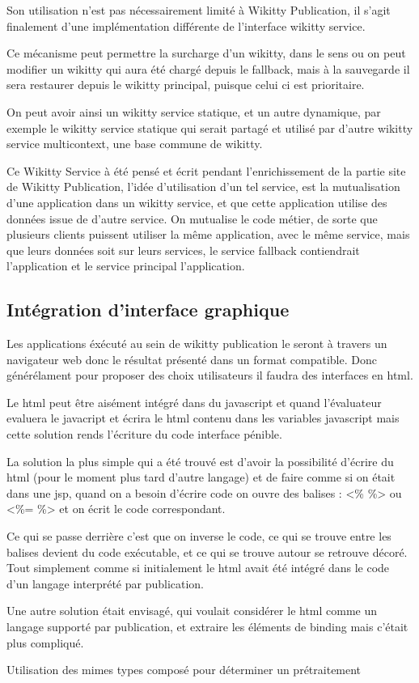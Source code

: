 Son utilisation n'est pas nécessairement limité à Wikitty Publication, il s'agit
finalement d'une implémentation différente de l'interface wikitty service. 

Ce mécanisme peut permettre la surcharge d'un wikitty, dans le sens ou on peut
modifier un wikitty qui aura été chargé depuis le fallback, mais à la sauvegarde
il sera restaurer depuis le wikitty principal, puisque celui ci est prioritaire.

On peut avoir ainsi un wikitty service statique, et un autre dynamique, par
exemple le wikitty service statique qui serait partagé et utilisé par d'autre
wikitty service multicontext, une base commune de wikitty. 

Ce Wikitty Service à été pensé et écrit pendant l'enrichissement de la partie 
site de Wikitty Publication, l'idée d'utilisation d'un tel service, est la 
mutualisation d'une application dans un wikitty service, et que cette 
application utilise des données issue de d'autre service. On mutualise le code 
métier, de sorte que plusieurs clients puissent utiliser la même application, 
avec le même service, mais que leurs données soit sur leurs services, 
le service fallback contiendrait l'application et le service principal 
l'application.

\subsection{Intégration d'interface graphique}

Les applications éxécuté au sein de wikitty publication le seront à travers 
un navigateur web donc le résultat présenté dans un format compatible.
Donc générélament pour proposer des choix utilisateurs il faudra des interfaces
en html.

Le html peut être aisément intégré dans du javascript et quand l'évaluateur
evaluera le javacript et écrira le html contenu dans les variables javascript
mais cette solution rends l'écriture du code interface pénible.





La solution la plus simple qui a été trouvé est d'avoir la possibilité d'écrire 
du html (pour le moment plus tard d'autre langage) et de faire comme si on était
dans une jsp, quand on a besoin d'écrire code on ouvre des balises : <\% \%>
ou <\%= \%> et on écrit le code correspondant.

Ce qui se passe derrière c'est que on inverse le code, ce qui se trouve entre
les balises devient du code exécutable, et ce qui se trouve autour se retrouve
décoré. Tout simplement comme si initialement le html avait été intégré dans
le code d'un langage interprété par publication.

Une autre solution était envisagé, qui voulait considérer le html comme un langage
supporté par publication, et extraire les éléments de binding mais c'était plus 
compliqué.

Utilisation des mimes types composé pour déterminer un prétraitement

